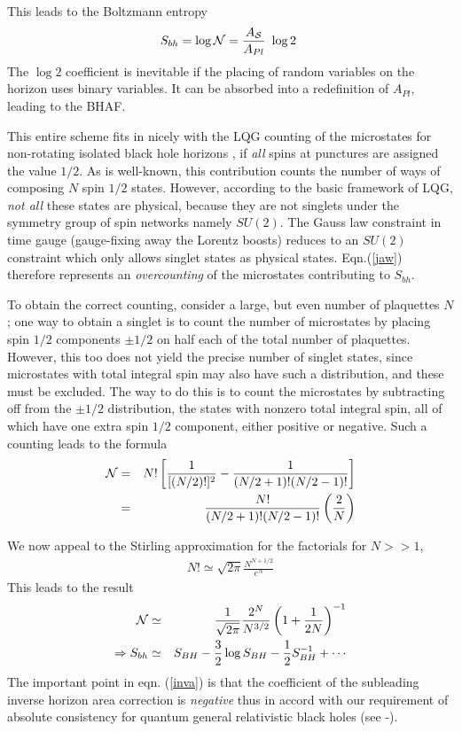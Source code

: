 \documentclass[11pt]{article}
\begin{document}
This leads to the Boltzmann entropy 
\begin{eqnarray}
S_{bh} = \log {\cal N} = \frac{A_{\cal S}}{A_{Pl}} ~\log 2 ~\label{jaw}
\end{eqnarray} 
The $\log 2$ coefficient is inevitable if the placing of random variables on the horizon uses binary variables. It can be absorbed into a redefinition of $A_{Pl}$, leading to the BHAF.

This entire scheme fits in nicely with the LQG counting of the microstates for non-rotating isolated black hole horizons \cite{dkm2001}, if {\it all} spins at punctures are assigned the value $1/2$. As is well-known, this contribution counts the number of ways of composing $N$ spin $1/2$ states. However, according to the basic framework of LQG, {\it not all} these states are physical, because they are not singlets under the symmetry group of spin networks namely $SU(2)$. The Gauss law constraint in time gauge (gauge-fixing away the Lorentz boosts) reduces to an $SU(2)$ constraint which only allows singlet states as physical states. Eqn.(\ref{jaw}) therefore represents an {\it overcounting} of the microstates  contributing to $S_{bh}$. 

To obtain the correct counting, consider a large, but even number of plaquettes $N$; one way to obtain a singlet is to count the number of microstates by placing spin $1/2$ components $\pm 1/2$ on half each of the total number of plaquettes. However, this too does not yield the precise number of singlet states, since microstates with total integral spin may also have such a distribution, and these must be excluded. The way to do this is to count the microstates by subtracting off from the $\pm 1/2$ distribution, the states with nonzero total integral spin, all of which have one extra spin $1/2$ component, either positive or negative. Such a counting leads to the formula
\begin{eqnarray}
{\cal N} &=& N! \left[ \frac{1}{[(N/2)!]^2} - \frac{1}{(N/2 +1)! (N/2 -1)!} \right] \nonumber \\
&=& \frac{N!}{(N/2 +1)! (N/2-1)! } \left( \frac{2}{N} \right)
\end{eqnarray}      

We now appeal to the Stirling approximation for the factorials for $N >> 1$,
\begin{eqnarray}
N! \simeq \sqrt{2\pi} \frac{N^{N+1/2}}{e^N} \label{sti}
\end{eqnarray}
This leads to the result
\begin{eqnarray}
{\cal N} & \simeq & \frac{1}{\sqrt{2\pi}} \frac{2^N}{N^{3/2}} \left( 1 + \frac{1}{2N} \right)^{-1} \nonumber \\
\Rightarrow S_{bh} &\simeq& S_{BH} - \frac{3}{2} \log S_{BH} - \frac12 S_{BH}^{-1} + \cdots \label{inva}
\end{eqnarray}
The important point in eqn. (\ref{inva}) is that the coefficient of the subleading inverse horizon area correction is {\it negative} thus in accord with our requirement of absolute consistency for quantum general relativistic black holes (see \cite{pm2024}-\cite{pm2025}). 
\end{document}
